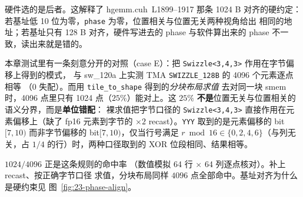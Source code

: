 硬件选的是后者。这解释了 hgemm.cuh~L1899--1917 那条 1024 B 对齐的硬约定：
若基址低 10 位为零，\texttt{phase} 为零，位置相关与位置无关两种视角给出
相同的地址；若基址只有 128 B 对齐，硬件写进去的 phase 与软件算出来的
phase 不一致，读出来就是错的。

本章测试里有一条刻意分开的对照（case E）：把
\texttt{Swizzle\allowbreak{}<3,\allowbreak{}4,\allowbreak{}3>} 作用在字节偏移上得到的模式，
与 sw\_120a 上实测 TMA \texttt{SWIZZLE\_\allowbreak{}128\allowbreak{}B} 的 4096 个元素逐点相等
（$0$ 失配）。而用 \texttt{tile\_\allowbreak{}to\_\allowbreak{}shape} 得到的\emph{分块布局求值}
去对同一块 smem 时，4096 点里只有 1024 点（$25\%$）能对上。这 $25\%$
\textbf{不是}位置无关与位置相关的语义分界，而是\textbf{单位错配}：
裸求值把字节口径的 \texttt{Swizzle\allowbreak{}<3,\allowbreak{}4,\allowbreak{}3>} 直接作用在元素偏移上（缺了
fp16 元素到字节的 $\times2$ recast）。\texttt{YYY} 取到的是元素偏移的
bit$[7,10)$ 而非字节偏移的 bit$[7,10)$，仅当行号满足
$r\bmod 16\in\{0,2,4,6\}$（与列无关，占 $1/4$ 的行）时，两种口径取到的
XOR 位段相同、结果相等。

$1024/4096$ 正是这条规则的命中率
（数值模拟 64 行 $\times$ 64 列逐点核对）。补上 recast、按正确字节口径
求值，分块布局同样 $4096$ 点全部命中。基址对齐为什么是硬约束见
图~\ref{fig:23-phase-align}。

